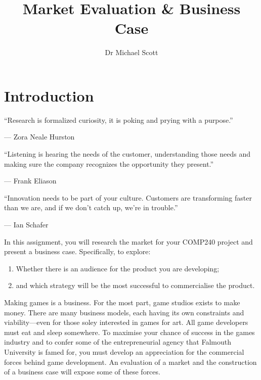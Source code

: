 \documentclass{../fal_assignment}
\title{Market Evaluation \& Business Case}
\author{Dr Michael Scott}
\begin{document}
\maketitle

\section*{Introduction}

\begin{marginquote}
  ``Research is formalized curiosity, it is poking and prying with a purpose.''
  
   --- Zora Neale Hurston
   
    \marginquoterule
    
    ``Listening is hearing the needs of the customer, understanding those needs and making sure the company recognizes the opportunity they present.''
    
    --- Frank Eliason
    
    \marginquoterule
    
    ``Innovation needs to be part of your culture. Customers are transforming faster than we are, and if we don't catch up, we're in trouble.''
    
    --- Ian Schafer
      
\end{marginquote}

In this assignment, you will research the market for your COMP240 project and present a business case. Specifically, to explore: 

\begin{enumerate}[label=(\roman*)]
    \item Whether there is an audience for the product you are developing;
    \item and which strategy will be the most successful to commercialise the product.
\end{enumerate}

Making games is a business. For the most part, game studios exists to make money. There are many business models, each having its own constraints and viability---even for those soley interested in games for art. All game developers must eat and sleep somewhere. To maximise your chance of success in the games industry and to confer some of the entrepreneurial agency that Falmouth University is famed for, you must develop an appreciation for the commercial forces behind game development. An evaluation of a market and the construction of a business case will expose some of these forces.
\end{document}
